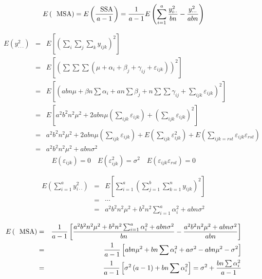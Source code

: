 \documentclass{article}
\begin{document}
\bigskip 

\begin{equation*}
E\left( \text{MSA}\right) =E\left( \frac{\text{SSA}}{a-1}\right) =\frac{1}{%
a-1}E\left( \sum\limits_{i=1}^{a}\frac{y_{i\cdot \cdot }^{2}}{bn}-\frac{%
y_{\cdot \cdot \cdot }^{2}}{abn}\right) 
\end{equation*}

\begin{eqnarray*}
E\left( y_{\cdot \cdot \cdot }^{2}\right)  &=&E\left[ \left(
\sum\limits_{i}\sum\limits_{j}\sum\limits_{k}y_{ijk}\right) ^{2}\right]  \\
&=&E\left[ \left( \sum \sum \sum \left( \mu +\alpha _{i}+\beta _{j}+\gamma
_{ij}+\varepsilon _{ijk}\right) \right) ^{2}\right]  \\
&=&E\left[ \left( abn\mu +\beta n\sum \alpha _{i}+an\sum \beta _{j}+n\sum
\sum \gamma _{ij}+\sum\limits_{ijk}\varepsilon _{ijk}\right) ^{2}\right]  \\
&=&E\left[ a^{2}b^{2}n^{2}\mu ^{2}+2abn\mu \left(
\sum\limits_{ijk}\varepsilon _{ijk}\right) +\left(
\sum\limits_{ijk}\varepsilon _{ijk}\right) ^{2}\right]  \\
&=&a^{2}b^{2}n^{2}\mu ^{2}+2abn\mu \left( \sum\limits_{ijk}\varepsilon
_{ijk}\right) +E\left( \sum\limits_{ijk}\varepsilon _{ijk}^{2}\right)
+E\left( \sum\limits_{ijk=rst}\varepsilon _{ijk}\varepsilon _{rst}\right)  \\
&=&a^{2}b^{2}n^{2}\mu ^{2}+abn\sigma ^{2}
\end{eqnarray*}%
\begin{equation*}
E\left( \varepsilon _{ijk}\right) =0\quad E\left( \varepsilon
_{ijk}^{2}\right) =\sigma ^{2}\quad E\left( \varepsilon _{ijk}\varepsilon
_{rst}\right) =0
\end{equation*}

\bigskip 

\begin{eqnarray*}
E\left( \sum\limits_{i=1}^{a}y_{i\cdot \cdot }^{2}\right)  &=&E\left[
\sum\limits_{i=1}^{a}\left(
\sum\limits_{j=1}^{b}\sum\limits_{k=1}^{n}y_{ijk}\right) ^{2}\right]  \\
&=&\cdots  \\
&=&a^{2}b^{2}n^{2}\mu ^{2}+b^{2}n^{2}\sum_{i=1}^{a}\alpha _{i}^{2}+abn\sigma
^{2}
\end{eqnarray*}

\begin{eqnarray*}
E\left( \text{MSA}\right) &=&\frac{1}{a-1}\left[ \frac{a^{2}b^{2}n^{2}\mu
^{2}+b^{2}n^{2}\sum_{i=1}^{a}\alpha _{i}^{2}+abn\sigma ^{2}}{bn}-\frac{%
a^{2}b^{2}n^{2}\mu ^{2}+abn\sigma ^{2}}{abn}\right] \\
&=&\frac{1}{a-1}\left[ abn\mu ^{2}+bn\sum \alpha _{i}^{2}+a\sigma
^{2}-abn\mu ^{2}-\sigma ^{2}\right] \\
&=&\frac{1}{a-1}\left[ \sigma ^{2}\left( a-1\right) +bn\sum \alpha _{i}^{2}%
\right] =\sigma ^{2}+\frac{bn\sum \alpha _{i}^{2}}{a-1}
\end{eqnarray*}
\end{document}
